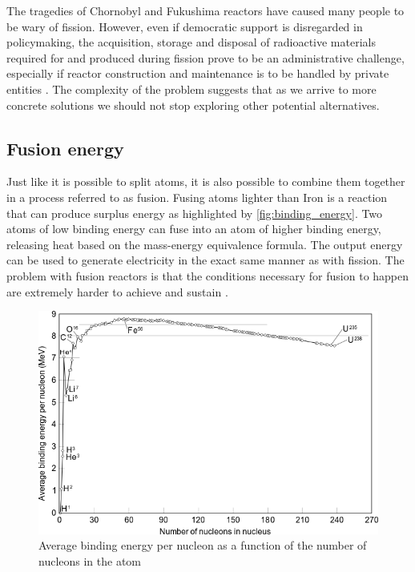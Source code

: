   The tragedies of Chornobyl and Fukushima reactors
  have caused many people to be wary of fission. However, even if
  democratic support is disregarded in policymaking, the acquisition,
  storage and disposal of radioactive materials required for and produced 
  during fission prove to be an administrative challenge, especially 
  if reactor construction and maintenance is to be handled
  by private entities \cite{fission_tech_and_current_issues}. 
  The complexity of the problem suggests that 
  as we arrive to more concrete solutions we 
  should not stop exploring other potential alternatives.

\subsection{Fusion energy}

  Just like it is possible to split atoms, it is also possible to
  combine them together in a process referred to as fusion. 
  Fusing atoms lighter than Iron is a reaction that 
  can produce surplus energy as highlighted by \autoref{fig:binding_energy}.
  Two atoms of low binding energy can fuse into an atom of higher 
  binding energy, releasing heat based on the mass-energy equivalence formula.
  The output energy can be used to generate electricity in
  the exact same manner as with fission. 
  The problem with fusion reactors is that the conditions necessary
  for fusion to happen are extremely harder to achieve and sustain 
  \cite{structural_materials_fusion}.
	\begin{figure}[H]
	  \centering
	  \includegraphics[width=.85\linewidth]{media/binding_energy.png}
	  \caption{Average binding energy per nucleon as a function of the number of nucleons in the atom}
	  \label{fig:binding_energy}
	\end{figure}

